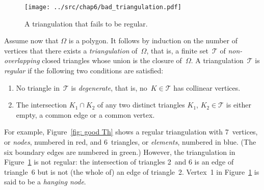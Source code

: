 \begin{figure}
\caption{A triangulation that fails to be regular.}\label{fig: bad Th}
\begin{center}
\texttt{[image: ../src/chap6/bad\_triangulation.pdf]} 
\end{center}
\end{figure}

Assume now that $\Omega$ is a polygon.  It follows by induction on the number 
of vertices that there exists a \emph{triangulation} of~$\Omega$, that is, a 
finite set~$\mathcal{T}$ of \emph{non-overlapping} closed triangles whose 
union is the closure of~$\Omega$. A triangulation~$\mathcal{T}$ is 
\emph{regular} if the following two conditions are satisfied:
\begin{enumerate}
\item No triangle in~$\mathcal{T}$ is \emph{degenerate}, that is, 
no~$K\in\mathcal{T}$ has collinear vertices.
\item The intersection $K_1\cap K_2$ of any two distinct triangles $K_1$, 
$K_2\in\mathcal{T}$ is either empty, a common edge or a common vertex.
\end{enumerate}
For example, Figure~\ref{fig: good Th} shows a regular triangulation with 
7~vertices, or \emph{nodes}, numbered in red, and 6~triangles, or 
\emph{elements}, numbered in blue.  (The six boundary edges are 
numbered in green.) However, the triangulation in 
Figure~\ref{fig: bad Th} is not regular: the intersection of triangles 2~and 6 
is an edge of triangle~6 but is not (the whole of) an edge of triangle~2.
Vertex~1 in Figure~\ref{fig: bad Th} is said to be a \emph{hanging node}.

